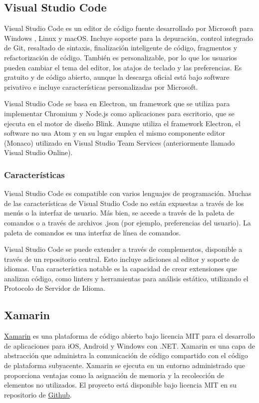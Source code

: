 \subsection{Visual Studio Code}
Visual Studio Code es un editor de código fuente desarrollado por Microsoft para Windows , Linux y macOS. Incluye soporte para la depuración, control integrado de Git, resaltado de sintaxis, finalización inteligente de código, fragmentos y refactorización de código. También es personalizable, por lo que los usuarios pueden cambiar el tema del editor, los atajos de teclado y las preferencias. Es gratuito y de código abierto, aunque la descarga oficial está bajo software privativo e incluye características personalizadas por Microsoft.

Visual Studio Code se basa en Electron, un framework que se utiliza para implementar Chromium y Node.js como aplicaciones para escritorio, que se ejecuta en el motor de diseño Blink. Aunque utiliza el framework Electron, el software no usa Atom y en su lugar emplea el mismo componente editor (Monaco) utilizado en Visual Studio Team Services (anteriormente llamado Visual Studio Online).

\subsubsection{Características}
Visual Studio Code es compatible con varios lenguajes de programación. Muchas de las características de Visual Studio Code no están expuestas a través de los menús o la interfaz de usuario. Más bien, se accede a través de la paleta de comandos o a través de archivos .json (por ejemplo, preferencias del usuario). La paleta de comandos es una interfaz de línea de comandos.

Visual Studio Code se puede extender a través de complementos, disponible a través de un repositorio central. Esto incluye adiciones al editor y soporte de idiomas. Una característica notable es la capacidad de crear extensiones que analizan código, como linters y herramientas para análisis estático, utilizando el Protocolo de Servidor de Idioma.

\subsection{Xamarin}
\href{https://dotnet.microsoft.com/apps/xamarin}{Xamarin} es una plataforma de código abierto bajo licencia MIT para el desarrollo de  aplicaciones para iOS, Android y Windows con .NET. Xamarin es una capa de abstracción que administra la comunicación de código compartido con el código de plataforma subyacente. Xamarin se ejecuta en un entorno administrado que proporciona ventajas como la asignación de memoria y la recolección de elementos no utilizados. El proyecto está disponible bajo licencia MIT en su repositorio de \href{https://github.com/xamarin}{Github}.


